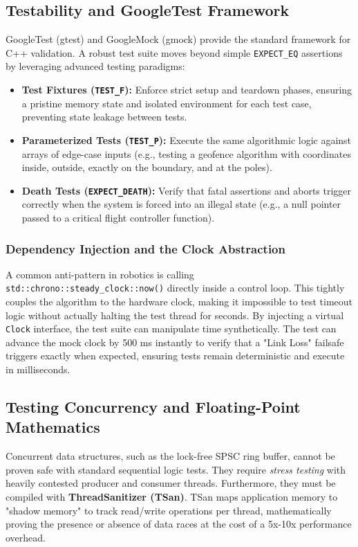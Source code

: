 \documentclass{article}
\begin{document}
\subsection{Testability and GoogleTest Framework}
GoogleTest (gtest) and GoogleMock (gmock) provide the standard framework for C++ validation. A robust test suite moves beyond simple \texttt{EXPECT\_EQ} assertions by leveraging advanced testing paradigms:
\begin{itemize}
    \item \textbf{Test Fixtures (\texttt{TEST\_F}):} Enforce strict setup and teardown phases, ensuring a pristine memory state and isolated environment for each test case, preventing state leakage between tests.
    \item \textbf{Parameterized Tests (\texttt{TEST\_P}):} Execute the same algorithmic logic against arrays of edge-case inputs (e.g., testing a geofence algorithm with coordinates inside, outside, exactly on the boundary, and at the poles).
    \item \textbf{Death Tests (\texttt{EXPECT\_DEATH}):} Verify that fatal assertions and aborts trigger correctly when the system is forced into an illegal state (e.g., a null pointer passed to a critical flight controller function).
\end{itemize}

\subsubsection{Dependency Injection and the Clock Abstraction}
A common anti-pattern in robotics is calling \texttt{std::chrono::\allowbreak steady\_clock::\allowbreak now()} directly inside a control loop. This tightly couples the algorithm to the hardware clock, making it impossible to test timeout logic without actually halting the test thread for seconds. By injecting a virtual \texttt{Clock} interface, the test suite can manipulate time synthetically. The test can advance the mock clock by 500 ms instantly to verify that a "Link Loss" failsafe triggers exactly when expected, ensuring tests remain deterministic and execute in milliseconds.

\subsection{Testing Concurrency and Floating-Point Mathematics}
Concurrent data structures, such as the lock-free SPSC ring buffer, cannot be proven safe with standard sequential logic tests. They require \textit{stress testing} with heavily contested producer and consumer threads. Furthermore, they must be compiled with \textbf{ThreadSanitizer (TSan)}. TSan maps application memory to "shadow memory" to track read/write operations per thread, mathematically proving the presence or absence of data races at the cost of a 5x-10x performance overhead. 
\end{document}
